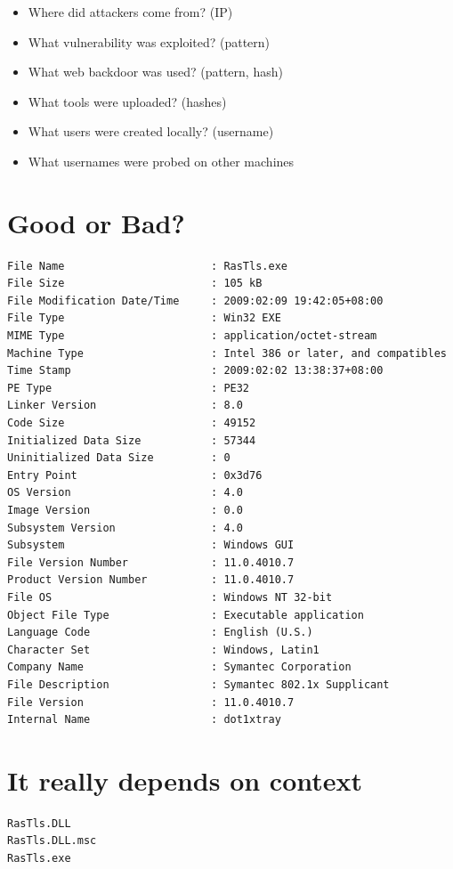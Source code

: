 \documentclass[11pt]{article}
\begin{document}
\begin{itemize}
\item Where did attackers come from? (IP)
\item What vulnerability was exploited? (pattern)
\item What web backdoor was used? (pattern, hash)
\item What tools were uploaded? (hashes)
\item What users were created locally? (username)
\item What usernames were probed on other machines
\end{itemize}

\section*{Good or Bad?}
\label{sec-13}
\begin{verbatim}
File Name                       : RasTls.exe
File Size                       : 105 kB
File Modification Date/Time     : 2009:02:09 19:42:05+08:00
File Type                       : Win32 EXE
MIME Type                       : application/octet-stream
Machine Type                    : Intel 386 or later, and compatibles
Time Stamp                      : 2009:02:02 13:38:37+08:00
PE Type                         : PE32
Linker Version                  : 8.0
Code Size                       : 49152
Initialized Data Size           : 57344
Uninitialized Data Size         : 0
Entry Point                     : 0x3d76
OS Version                      : 4.0
Image Version                   : 0.0
Subsystem Version               : 4.0
Subsystem                       : Windows GUI
File Version Number             : 11.0.4010.7
Product Version Number          : 11.0.4010.7
File OS                         : Windows NT 32-bit
Object File Type                : Executable application
Language Code                   : English (U.S.)
Character Set                   : Windows, Latin1
Company Name                    : Symantec Corporation
File Description                : Symantec 802.1x Supplicant
File Version                    : 11.0.4010.7
Internal Name                   : dot1xtray
\end{verbatim}
\section*{It really depends on context}
\label{sec-14}

\begin{verbatim}
RasTls.DLL 
RasTls.DLL.msc
RasTls.exe
\end{verbatim}
\end{document}
